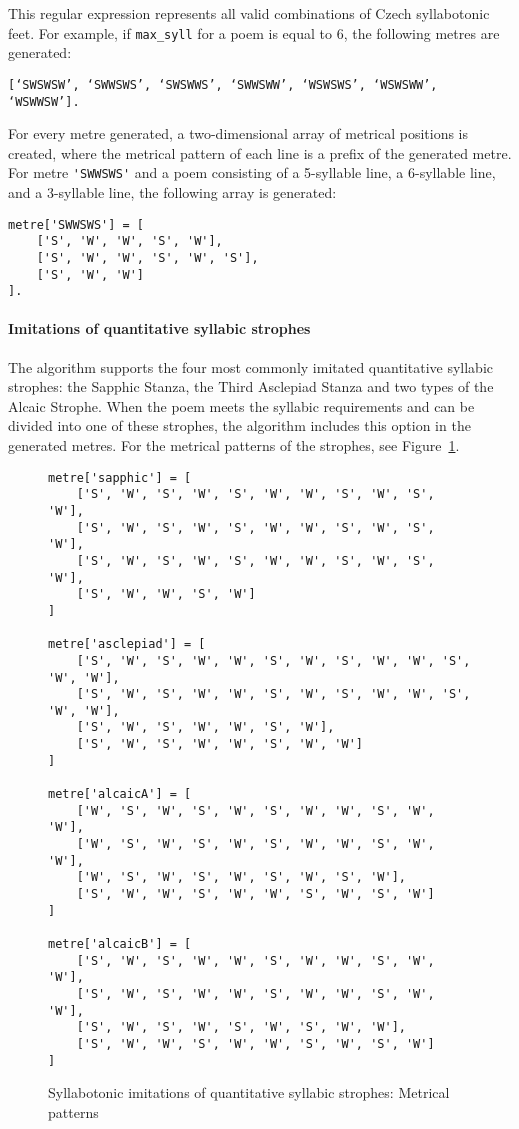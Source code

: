 This regular expression represents all valid combinations of Czech syllabotonic feet. For example, if \verb|max_syll| for a poem is equal to 6, the following metres are generated:

\begin{verbatim}
[‘SWSWSW’, ‘SWWSWS’, ‘SWSWWS’, ‘SWWSWW’, ‘WSWSWS’, ‘WSWSWW’, ‘WSWWSW’].
\end{verbatim}

For every metre generated, a two-dimensional array of metrical positions is created, where the metrical pattern of each line is a prefix of the generated metre. For metre \verb|'SWWSWS'| and a poem consisting of a 5-syllable line, a 6-syllable line, and a 3-syllable line, the following array is generated:

\pagebreak

\begin{verbatim}
metre['SWWSWS'] = [
    ['S', 'W', 'W', 'S', 'W'],
    ['S', 'W', 'W', 'S', 'W', 'S'],
    ['S', 'W', 'W']
].
\end{verbatim}

\paragraph{Imitations of quantitative syllabic strophes}
The algorithm supports the four most commonly imitated quantitative syllabic strophes: the Sapphic Stanza, the Third Asclepiad Stanza and two types of the Alcaic Strophe. When the poem meets the syllabic requirements and can be divided into one of these strophes, the algorithm includes this option in the generated metres. For the metrical patterns of the strophes, see Figure~\ref{fig:kveta-data-driven-strophes}.

\begin{figure}[htpb]
\centering
\begin{verbatim}
metre['sapphic'] = [
    ['S', 'W', 'S', 'W', 'S', 'W', 'W', 'S', 'W', 'S', 'W'],
    ['S', 'W', 'S', 'W', 'S', 'W', 'W', 'S', 'W', 'S', 'W'],
    ['S', 'W', 'S', 'W', 'S', 'W', 'W', 'S', 'W', 'S', 'W'],
    ['S', 'W', 'W', 'S', 'W']
]

metre['asclepiad'] = [
    ['S', 'W', 'S', 'W', 'W', 'S', 'W', 'S', 'W', 'W', 'S', 'W', 'W'],
    ['S', 'W', 'S', 'W', 'W', 'S', 'W', 'S', 'W', 'W', 'S', 'W', 'W'],
    ['S', 'W', 'S', 'W', 'W', 'S', 'W'],
    ['S', 'W', 'S', 'W', 'W', 'S', 'W', 'W']
]

metre['alcaicA'] = [
    ['W', 'S', 'W', 'S', 'W', 'S', 'W', 'W', 'S', 'W', 'W'],
    ['W', 'S', 'W', 'S', 'W', 'S', 'W', 'W', 'S', 'W', 'W'],
    ['W', 'S', 'W', 'S', 'W', 'S', 'W', 'S', 'W'],
    ['S', 'W', 'W', 'S', 'W', 'W', 'S', 'W', 'S', 'W']
]

metre['alcaicB'] = [
    ['S', 'W', 'S', 'W', 'W', 'S', 'W', 'W', 'S', 'W', 'W'],
    ['S', 'W', 'S', 'W', 'W', 'S', 'W', 'W', 'S', 'W', 'W'],
    ['S', 'W', 'S', 'W', 'S', 'W', 'S', 'W', 'W'],
    ['S', 'W', 'W', 'S', 'W', 'W', 'S', 'W', 'S', 'W']
]
\end{verbatim}
\caption{Syllabotonic imitations of quantitative syllabic strophes: Metrical patterns}\label{fig:kveta-data-driven-strophes}
\end{figure}

